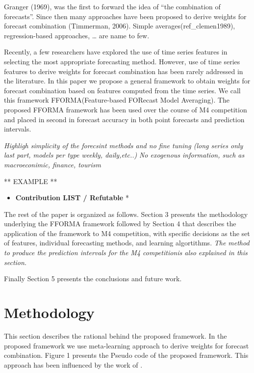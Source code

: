 \documentclass[11pt,a4paper,]{article}
\providecommand{\tightlist}{%
  \setlength{\itemsep}{0pt}\setlength{\parskip}{0pt}}
\theoremstyle{definition}
\theoremstyle{definition}
\theoremstyle{definition}
\theoremstyle{remark}
\begin{document}
Granger (1969), was the first to forward the idea of ``the combination
of forecasts''. Since then many approaches have been proposed to derive
weights for forecast combination (Timmerman, 2006). Simple
averages(ref\_clemen1989), regression-based approaches, \ldots{} are
name to few.

Recently, a few researchers have explored the use of time series
features in selecting the most appropriate forecasting method. However,
use of time series features to derive weights for forecast combination
has been rarely addressed in the literature. In this paper we propose a
general framework to obtain weights for forecast combination based on
features computed from the time series. We call this framework
FFORMA(Feature-based FORecast Model Averaging). The proposed FFORMA
framework has been used over the course of M4 competition and placed in
second in forecast accuracy in both point forecasts and prediction
intervals.

\emph{Highligh simplicity of the forecsint methods and no fine tuning
(long series only last part, models per type weekly, daily,etc..)}
\emph{No exogenous information, such as macroeconimic, finance, tourism}

** EXAMPLE **

\begin{itemize}
\tightlist
\item
  \textbf{Contribution LIST / Refutable} *
\end{itemize}

The rest of the paper is organized as follows. Section 3 presents the
methodology underlying the FFORMA framework followed by Section 4 that
describes the application of the framework to M4 competition, with
specific decisions as the set of features, individual forecasting
methods, and learning algortithms. \emph{The method to produce the
prediction intervals for the M4 competitionis also explained in this
section.}

Finally Section 5 presents the conclusions and future work.

\section{Methodology}\label{methodology}

This section describes the rational behind the proposed framework. In
the proposed framework we use meta-learning approach to derive weights
for forecast combination. Figure 1 presents the Pseudo code of the
proposed framework. This approach has been influenced by the work of
\textcite{fforms}.
\end{document}
